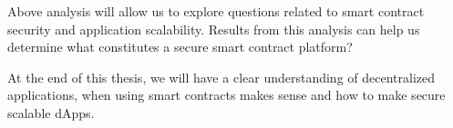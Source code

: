Above analysis will allow us to explore questions related to smart contract security and application scalability. Results from this analysis can help us determine what constitutes a secure smart contract platform?

At the end of this thesis, we will have a clear understanding of decentralized applications, when using smart contracts makes sense and how to make secure scalable dApps.
